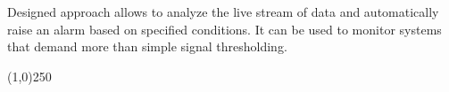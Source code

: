 \documentclass[11pt, letterpaper]{article}            %
\begin{document}
Designed approach allows to analyze the live stream of data and automatically raise an alarm based on specified conditions. It can be used to monitor systems that demand more than simple signal thresholding.\\



\begin{center} \noindent \line(1,0){250} \end{center}       %


\newpage                                                                 %
{}

\end{document}
